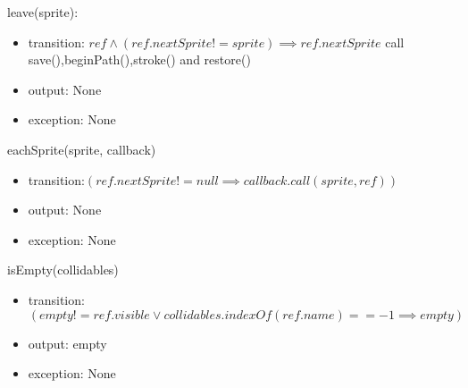 \documentclass[12pt]{article}
\begin{document}
\noindent  leave(sprite):
\begin{itemize}
\item transition: $ ref \land (ref.nextSprite != sprite) \implies ref.nextSprite$
call save(),beginPath(),stroke() and restore()
\item output: None
\item exception: None
\end{itemize}

\noindent eachSprite(sprite, callback)
\begin{itemize}
\item transition:$(ref.nextSprite != null \implies callback.call(sprite, ref))$
\item output: None
\item exception: None
\end{itemize}

\noindent isEmpty(collidables)
\begin{itemize}
\item transition:$(empty != ref.visible \lor collidables.indexOf(ref.name)==-1 \implies  empty)$
\item output: empty
\item exception: None
\end{itemize}
\end{document}
